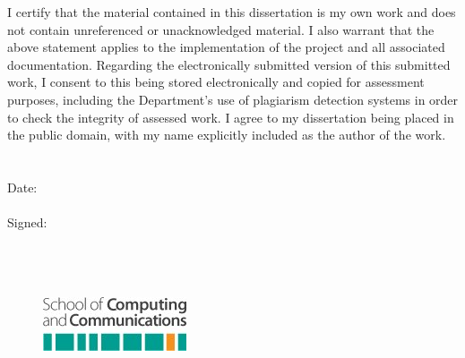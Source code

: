 I certify that the material contained in this dissertation is my own work and does not contain unreferenced or unacknowledged material. I also warrant that the above statement applies to the implementation of the project and all associated documentation. Regarding the electronically submitted version of this submitted work, I consent to this being stored electronically and copied for assessment purposes, including the Department’s use of plagiarism detection systems in order to check the integrity of assessed work. I agree to my dissertation being placed in the public domain, with my name explicitly included as the author of the work.
\\\\\\
Date:
\\\\
Signed: 
\\\\\\\\

\begin{figure}[H]
	\raggedright
	\includegraphics[scale=1]{images/dec_foot.jpg}
\end{figure}

\vspace*{\fill}

